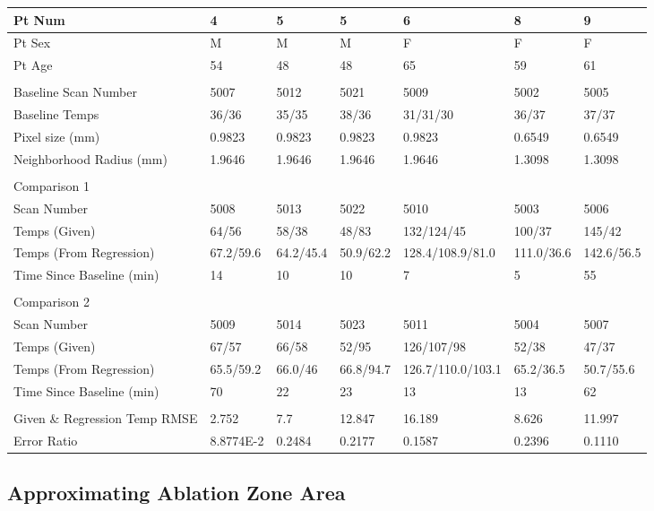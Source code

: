 \documentclass[]{spie}  %
\begin{document}
\begin{tabular}{ | l | l | l | l | l | l | l | }
\hline
	Pt Num & 4 & 5 & 5 & 6 & 8 & 9 \\ \hline
	Pt Sex & M & M & M & F & F & F \\ \hline
	Pt Age & 54 & 48 & 48 & 65 & 59 & 61 \\ \hline
	 &  &  &  &  &  &  \\ \hline
	Baseline Scan Number & 5007 & 5012 & 5021 & 5009 & 5002 & 5005 \\ \hline
	Baseline Temps & 36/36 & 35/35 & 38/36 & 31/31/30 & 36/37 & 37/37 \\ \hline
	Pixel size (mm) & 0.9823 & 0.9823 & 0.9823 & 0.9823 & 0.6549 & 0.6549 \\ \hline
	Neighborhood Radius (mm) & 1.9646 & 1.9646 & 1.9646 & 1.9646 & 1.3098 & 1.3098 \\ \hline
	 &  &  &  &  &  &  \\ \hline
	Comparison 1 &  &  &  &  &  &  \\ \hline
	Scan Number & 5008 & 5013 & 5022 & 5010 & 5003 & 5006 \\ \hline
	Temps (Given) & 64/56 & 58/38 & 48/83 & 132/124/45 & 100/37 & 145/42 \\ \hline
	Temps (From Regression) & 67.2/59.6 & 64.2/45.4 & 50.9/62.2 & 128.4/108.9/81.0 & 111.0/36.6 & 142.6/56.5 \\ \hline
	Time Since Baseline (min) & 14 & 10 & 10 & 7 & 5 & 55 \\ \hline
	 &  &  &  &  &  &  \\ \hline
	Comparison 2 &  &  &  &  &  &  \\ \hline
	Scan Number & 5009 & 5014 & 5023 & 5011 & 5004 & 5007 \\ \hline
	Temps (Given) & 67/57 & 66/58 & 52/95 & 126/107/98 & 52/38 & 47/37 \\ \hline
	Temps (From Regression) & 65.5/59.2 & 66.0/46 & 66.8/94.7 & 126.7/110.0/103.1 & 65.2/36.5 & 50.7/55.6 \\ \hline
	Time Since Baseline (min) & 70 & 22 & 23 & 13 & 13 & 62 \\ \hline
	&  &  &  &  &  &  \\ \hline
	Given \& Regression Temp RMSE & 2.752 & 7.7 & 12.847 & 16.189 & 8.626 & 11.997 \\ \hline
	Error Ratio & 8.8774E-2 & 0.2484 & 0.2177 & 0.1587 & 0.2396 & 0.1110 \\ \hline
\end{tabular}
 

\subsection{Approximating Ablation Zone Area}
\end{document}
